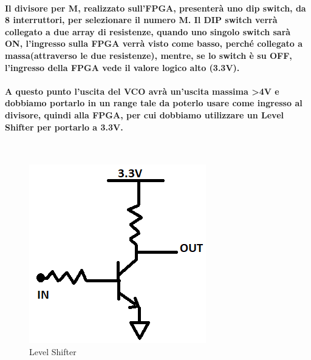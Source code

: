 \documentclass{article}
\begin{document}
\paragraph{Il divisore per M, realizzato sull'FPGA, presenterà uno dip switch, da 8 interruttori, per selezionare il numero M. Il DIP switch verrà collegato a due array di resistenze, quando uno singolo switch sarà ON, l'ingresso sulla FPGA verrà visto come basso, perché collegato a massa(attraverso le due resistenze), mentre, se lo switch è su OFF, l'ingresso della FPGA vede il valore logico alto (3.3V).}
\paragraph{A questo punto l'uscita del VCO avrà un'uscita massima \textgreater 4V e dobbiamo portarlo in un range tale da poterlo usare come ingresso al divisore, quindi alla FPGA, per cui dobbiamo utilizzare un Level Shifter per portarlo a 3.3V.}
~\begin{figure}[!h]%
\includegraphics[scale=0.7]{Level.png} 
\centering
\caption{Level Shifter}
\label{fig:foo}
\end{figure}
\end{document}
